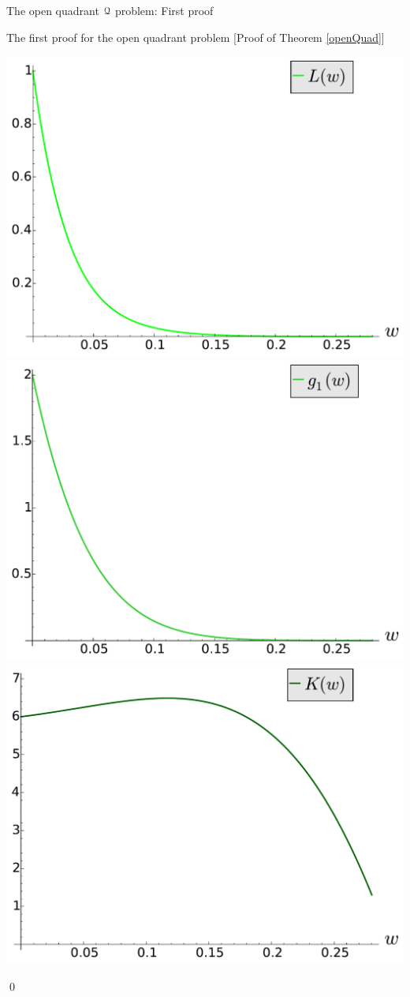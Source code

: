 \documentclass[11pt, a4paper, english, twoside, notitlepage, openright]{report}
\begin{document}
\begin{chapter}{The open quadrant $\mathcal{Q}$ problem: First proof}
\begin{section}{The first proof for the open quadrant problem} [Proof of Theorem \ref{openQuad}]
\begin{center}
\includegraphics[width=0.45\linewidth]{plots/ch1_16_L.pdf}
\includegraphics[width=0.45\linewidth]{plots/ch1_17_g_1.pdf} \\
\includegraphics[width=0.45\linewidth]{plots/ch1_18_K.pdf}		
\end{center}
\qed
\end{section}
\end{chapter}
\end{document}
